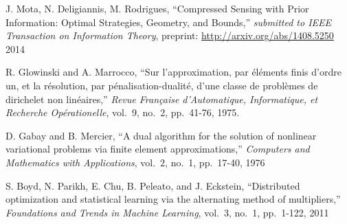 \documentclass[letter,10pt]{article}
\theoremstyle{definition}
\theoremstyle{nonumberplain}
\begin{document}
	
	\begin{thebibliography}{9}
	
			J. Mota, N. Deligiannis, M. Rodrigues,
			``Compressed Sensing with Prior Information: Optimal Strategies, Geometry, and Bounds,''
			\emph{submitted to IEEE Transaction on Information Theory}, preprint: \url{http://arxiv.org/abs/1408.5250}
			2014
		
			R. Glowinski and A. Marrocco,
			``Sur l'approximation, par  \'el\'ements finis d'ordre un, et la r\'esolution, par p\'enalisation-dualit\'e, d'une classe de probl\`emes de dirichelet non lin\'eaires,''
			\emph{Revue Fran\c{c}aise d'Automatique, Informatique, et Recherche Op\'erationelle}, 
			vol.\ 9, no.\ 2, pp.\ 41-76, 1975.
			
			D. Gabay and B. Mercier,
			``A dual algorithm for the solution of nonlinear variational problems via finite element approximations,''
			\emph{Computers and Mathematics with Applications},
			vol.\ 2, no.\ 1, pp.\ 17-40,
			1976
		
			S. Boyd, N. Parikh, E. Chu, B. Peleato, and J. Eckstein,
			``Distributed optimization and statistical learning via the alternating method of multipliers,''
			\emph{Foundations and Trends in Machine Learning}, 
			vol.\ 3, no.\ 1, pp.\ 1-122,
			2011
			
	
	\end{thebibliography}

	
	
\end{document}
